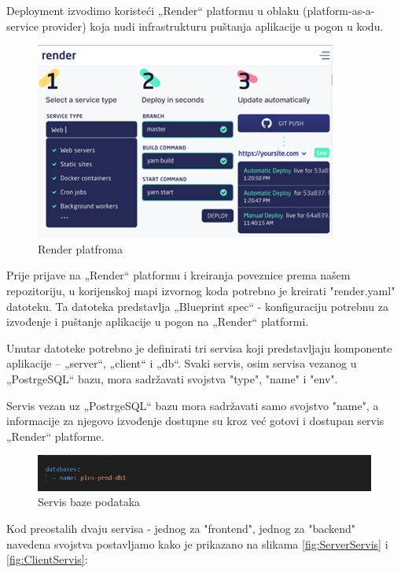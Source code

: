 Deployment izvodimo koristeći „Render“ platformu u oblaku (platform-as-a-service provider) koja nudi infrastrukturu puštanja aplikacije u pogon u kodu. 
		\begin{figure}[H]
			\includegraphics[scale=1.0]{slike/render.PNG} %
			\centering
			\caption{Render platfroma}
			\label{fig:render}
		\end{figure}
Prije prijave na „Render“ platformu i kreiranja poveznice prema našem repozitoriju, u korijenskoj mapi izvornog koda potrebno je kreirati "render.yaml" datoteku. Ta datoteka predstavlja „Blueprint spec“ - konfiguraciju potrebnu za izvođenje i puštanje aplikacije u pogon na „Render“ platformi.

Unutar datoteke potrebno je definirati tri servisa koji predstavljaju komponente aplikacije – „server“, „client“ i „db“.  Svaki servis, osim servisa vezanog u „PostrgeSQL“ bazu, mora sadržavati svojstva "type", "name" i "env". 

Servis vezan uz „PostrgeSQL“ bazu mora sadržavati samo svojstvo "name", a informacije za njegovo izvođenje dostupne su kroz već gotovi i dostupan servis „Render“ platforme. 
\begin{figure}[H]
			\includegraphics[scale=0.9]{slike/Slika2.PNG} %
			\centering
			\caption{Servis baze podataka}
			\label{fig:dbServis}
		\end{figure}

Kod preostalih dvaju servisa - jednog za "frontend", jednog za "backend" navedena svojstva postavljamo kako je prikazano na slikama \ref{fig:ServerServis} i \ref{fig:ClientServis}:

